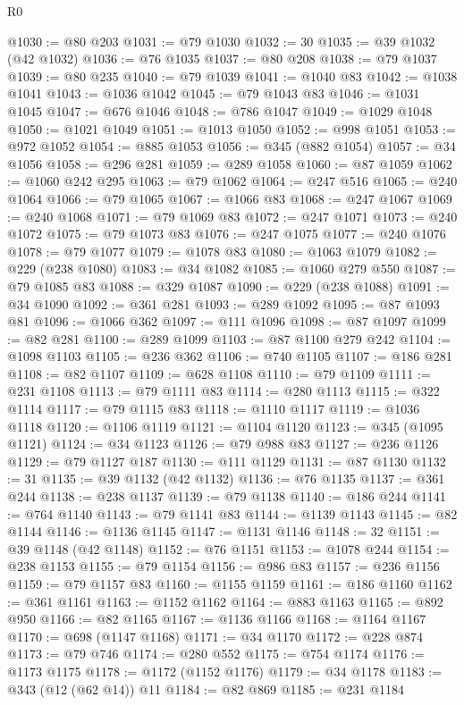 \begin{lexlean}{R0}
\begin{coremodule}
@1030 := @80 @203
@1031 := @79 @1030
@1032 := 30
@1035 := @39 @1032 (@42 @1032)
@1036 := @76 @1035
@1037 := @80 @208
@1038 := @79 @1037
@1039 := @80 @235
@1040 := @79 @1039
@1041 := @1040 @83
@1042 := @1038 @1041
@1043 := @1036 @1042
@1045 := @79 @1043 @83
@1046 := @1031 @1045
@1047 := @676 @1046
@1048 := @786 @1047
@1049 := @1029 @1048
@1050 := @1021 @1049
@1051 := @1013 @1050
@1052 := @998 @1051
@1053 := @972 @1052
@1054 := @885 @1053
@1056 := @345 (@882 @1054)
@1057 := @34 @1056
@1058 := @296 @281
@1059 := @289 @1058
@1060 := @87 @1059
@1062 := @1060 @242 @295
@1063 := @79 @1062
@1064 := @247 @516
@1065 := @240 @1064
@1066 := @79 @1065
@1067 := @1066 @83
@1068 := @247 @1067
@1069 := @240 @1068
@1071 := @79 @1069 @83
@1072 := @247 @1071
@1073 := @240 @1072
@1075 := @79 @1073 @83
@1076 := @247 @1075
@1077 := @240 @1076
@1078 := @79 @1077
@1079 := @1078 @83
@1080 := @1063 @1079
@1082 := @229 (@238 @1080)
@1083 := @34 @1082
@1085 := @1060 @279 @550
@1087 := @79 @1085 @83
@1088 := @329 @1087
@1090 := @229 (@238 @1088)
@1091 := @34 @1090
@1092 := @361 @281
@1093 := @289 @1092
@1095 := @87 @1093 @81
@1096 := @1066 @362
@1097 := @111 @1096
@1098 := @87 @1097
@1099 := @82 @281
@1100 := @289 @1099
@1103 := @87 @1100 @279 @242
@1104 := @1098 @1103
@1105 := @236 @362
@1106 := @740 @1105
@1107 := @186 @281
@1108 := @82 @1107
@1109 := @628 @1108
@1110 := @79 @1109
@1111 := @231 @1108
@1113 := @79 @1111 @83
@1114 := @280 @1113
@1115 := @322 @1114
@1117 := @79 @1115 @83
@1118 := @1110 @1117
@1119 := @1036 @1118
@1120 := @1106 @1119
@1121 := @1104 @1120
@1123 := @345 (@1095 @1121)
@1124 := @34 @1123
@1126 := @79 @988 @83
@1127 := @236 @1126
@1129 := @79 @1127 @187
@1130 := @111 @1129
@1131 := @87 @1130
@1132 := 31
@1135 := @39 @1132 (@42 @1132)
@1136 := @76 @1135
@1137 := @361 @244
@1138 := @238 @1137
@1139 := @79 @1138
@1140 := @186 @244
@1141 := @764 @1140
@1143 := @79 @1141 @83
@1144 := @1139 @1143
@1145 := @82 @1144
@1146 := @1136 @1145
@1147 := @1131 @1146
@1148 := 32
@1151 := @39 @1148 (@42 @1148)
@1152 := @76 @1151
@1153 := @1078 @244
@1154 := @238 @1153
@1155 := @79 @1154
@1156 := @986 @83
@1157 := @236 @1156
@1159 := @79 @1157 @83
@1160 := @1155 @1159
@1161 := @186 @1160
@1162 := @361 @1161
@1163 := @1152 @1162
@1164 := @883 @1163
@1165 := @892 @950
@1166 := @82 @1165
@1167 := @1136 @1166
@1168 := @1164 @1167
@1170 := @698 (@1147 @1168)
@1171 := @34 @1170
@1172 := @228 @874
@1173 := @79 @746
@1174 := @280 @552
@1175 := @754 @1174
@1176 := @1173 @1175
@1178 := @1172 (@1152 @1176)
@1179 := @34 @1178
@1183 := @343 (@12 (@62 @14)) @11
@1184 := @82 @869
@1185 := @231 @1184

\end{coremodule}
\end{lexlean}
